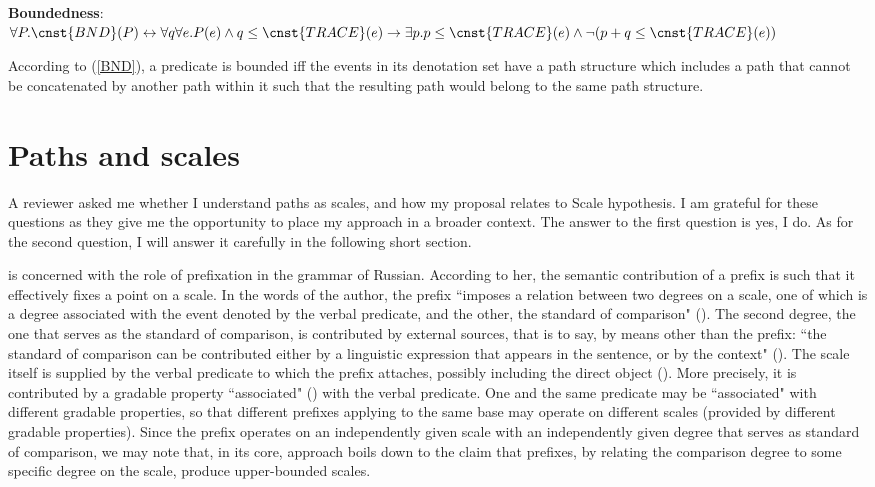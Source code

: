 \documentclass[output=paper,colorlinks,citecolor=brown]{langscibook}
\begin{document}

\ea\label{BND}
\textbf{Boundedness}:\\
$\forall P. \cnst{BND}(P) \leftrightarrow \forall q \forall e . P(e) \wedge q \leq \cnst{TRACE}(e) 
\rightarrow \exists p . p \leq \cnst{TRACE}(e) \wedge \neg(p+q \leq \cnst{TRACE}(e))$
\z

\noindent According to (\ref{BND}), a predicate is bounded iff the events in its denotation set have a path structure which includes a path that cannot be concatenated by another path within it such that the resulting path would belong to the same path structure. 



\section{Paths and scales}\label{scalessec}
A reviewer asked me whether I understand paths as scales, and how my proposal relates to  Scale hypothesis. I am grateful for these questions as they give me the opportunity to place my approach in a broader context. The answer to the first question is yes, I do. As for the second question, I will answer it carefully in the following short section. 

\citet{Kagan15} is concerned with the role of prefixation in the grammar of Russian. According to her, 
the semantic contribution of a prefix is such that it effectively fixes a point on a scale.
In the words of the author, the prefix ``imposes a relation between two degrees on a scale, one of which is a degree associated with the event denoted by the verbal predicate, and the other, the standard of comparison" (\citealt[24]{Kagan15}). The second degree, the one that serves as the standard of comparison, is contributed by external sources, that is to say, by means other than the prefix: ``the standard of comparison can be contributed either by a linguistic expression that appears in the sentence, or by the context" (\citealt[24]{Kagan15}).
The scale itself is supplied by the verbal predicate to which the prefix attaches, possibly including the direct object (\citealt[25]{Kagan15}). More precisely, it is contributed by a gradable property ``associated" (\citealt[26]{Kagan15}) with the verbal predicate. One and the same predicate may be ``associated" with different gradable properties, so that different prefixes applying to the same base may operate on different scales (provided by different gradable properties). Since the prefix operates on an independently given scale with an independently given degree that serves as standard of comparison, we may note that, in its core,  approach boils down to the claim that prefixes, by relating the comparison degree to some specific degree on the scale, produce upper-bounded scales. 
\end{document}
